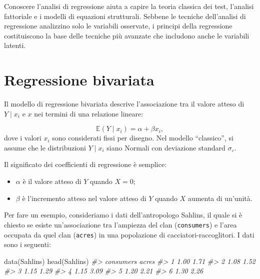\documentclass[
  11pt,
]{krantz}
\makeatletter
\newenvironment{Shaded}{\begin{snugshade}}{\end{snugshade}}
\newcommand{\CommentTok}[1]{\textcolor[rgb]{0.37,0.37,0.37}{\textit{#1}}}
\newcommand{\FunctionTok}[1]{\textcolor[rgb]{0,0,0}{#1}}
\newcommand{\NormalTok}[1]{#1}
\providecommand{\tightlist}{%
  \setlength{\itemsep}{0pt}\setlength{\parskip}{0pt}}
\newenvironment{kframe}{%
\medskip{}
\setlength{\fboxsep}{.8em}
 \def\at@end@of@kframe{}%
 \ifinner\ifhmode%
  \def\at@end@of@kframe{\end{minipage}}%
  \begin{minipage}{\columnwidth}%
 \fi\fi%
 \def\FrameCommand##1{\hskip\@totalleftmargin \hskip-\fboxsep
 \colorbox{shadecolor}{##1}\hskip-\fboxsep
     \hskip-\linewidth \hskip-\@totalleftmargin \hskip\columnwidth}%
 \MakeFramed {\advance\hsize-\width
   \@totalleftmargin\z@ \linewidth\hsize
   \@setminipage}}%
 {\par\unskip\endMakeFramed%
 \at@end@of@kframe}
\renewenvironment{Shaded}{\begin{kframe}}{\end{kframe}}
\theoremstyle{definition}
\theoremstyle{definition}
\theoremstyle{definition}
\theoremstyle{definition}
\theoremstyle{remark}
\makeatother
\begin{document}
Conoscere l'analisi di regressione aiuta a capire la teoria classica dei test, l'analisi fattoriale e i modelli di equazioni strutturali. Sebbene le tecniche dell'analisi di regressione analizzino solo le variabili osservate, i principi della regressione costituiscono la base delle tecniche più avanzate che includono anche le variabili latenti.

\hypertarget{regressione-bivariata}{%
\section{Regressione bivariata}\label{regressione-bivariata}}

Il modello di regressione bivariata descrive l'associazione tra il valore atteso di \(Y \mid x_i\) e \(x\) nei termini di una relazione lineare:

\[
\mathbb{E}(Y \mid x_i) = \alpha + \beta x_i,
\] dove i valori \(x_i\) sono considerati fissi per disegno. Nel modello ``classico'', si assume che le distribuzioni \(Y \mid x_i\) siano Normali con deviazione standard \(\sigma_\varepsilon\).

Il significato dei coefficienti di regressione è semplice:

\begin{itemize}
\tightlist
\item
  \(\alpha\) è il valore atteso di \(Y\) quando \(X = 0\);
\item
  \(\beta\) è l'incremento atteso nel valore atteso di \(Y\) quando \(X\) aumenta di un'unità.
\end{itemize}

Per fare un esempio, consideriamo i dati dell'antropologo Sahlins, il quale si è chiesto se esiste un'associazione tra l'ampiezza del clan (\texttt{consumers}) e l'area occupata da quel clan (\texttt{acres}) in una popolazione di cacciatori-raccoglitori. I dati sono i seguenti:

\begin{Shaded}
\begin{Highlighting}[]
\FunctionTok{data}\NormalTok{(Sahlins)}
\FunctionTok{head}\NormalTok{(Sahlins)}
\CommentTok{\#\textgreater{}   consumers acres}
\CommentTok{\#\textgreater{} 1      1.00  1.71}
\CommentTok{\#\textgreater{} 2      1.08  1.52}
\CommentTok{\#\textgreater{} 3      1.15  1.29}
\CommentTok{\#\textgreater{} 4      1.15  3.09}
\CommentTok{\#\textgreater{} 5      1.20  2.21}
\CommentTok{\#\textgreater{} 6      1.30  2.26}
\end{Highlighting}
\end{Shaded}
\end{document}
